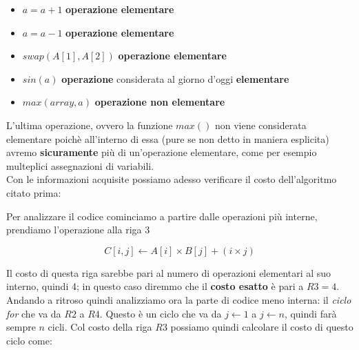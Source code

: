 \documentclass{article}
\begin{document}
\begin{itemize}
  \item $a = a + 1$ \textbf{operazione elementare}
  \item $a = a - 1$ \textbf{operazione elementare}
  \item $swap(A[1], A[2])$ \textbf{operazione elementare}
  \item $sin(a)$ \textbf{operazione} considerata al giorno d'oggi \textbf{elementare}
  \item $max(array, a)$ \textbf{operazione non elementare}
\end{itemize}

L'ultima operazione, ovvero la funzione $max()$ non viene considerata elementare
poichè all'interno di essa (pure se non detto in maniera esplicita) avremo 
\textbf{sicuramente} più di un'operazione elementare, come per esempio multeplici
assegnazioni di variabili.
\\ Con le informazioni acquisite possiamo adesso verificare il costo dell'algoritmo 
citato prima:

\vspace{0.3cm}

\begin{algorithm}[H]

\caption{CalcoloMatriceDistanzeManhattan(\protect\MatA, \protect\MatB, $n$)}


\BlankLine
{}
\end{algorithm}

\vspace{0.3cm}

Per analizzare il codice cominciamo a partire dalle operazioni più interne,
prendiamo l'operazione alla riga 3

\[ C[i,j] \leftarrow A[i] \times B[j] + (i \times j) \]

Il costo di questa riga sarebbe pari al numero di operazioni elementari al 
suo interno, quindi 4; in questo caso diremmo che il \textbf{costo esatto} 
è pari a $R3 = 4$. \\
Andando a ritroso quindi analizziamo ora la parte di codice meno interna: 
il \textit{ciclo for} che va da $R2$ a $R4$. Questo è un ciclo che va da
$j \leftarrow 1$ a $j \leftarrow n$, quindi farà sempre $n$ cicli.
Col costo della riga $R3$ possiamo quindi calcolare il costo di questo ciclo come:
\end{document}
